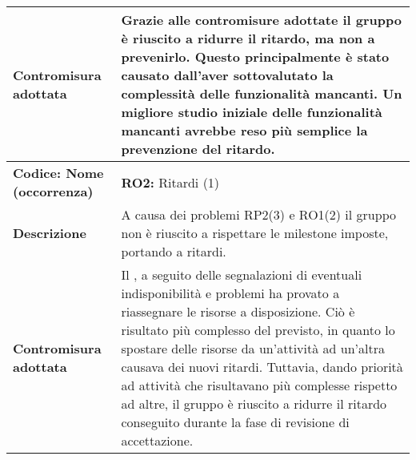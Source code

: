 {\begin{longtable}{C{3.5cm} | C{11cm}}
\textbf{Contromisura adottata} & Grazie alle contromisure adottate il gruppo è riuscito a ridurre il ritardo, ma non a prevenirlo. Questo principalmente è stato causato dall'aver sottovalutato la complessità delle funzionalità mancanti. Un migliore studio iniziale delle funzionalità mancanti avrebbe reso più semplice la prevenzione del ritardo.\\
\hline
\hline
{}\textbf{Codice: Nome (occorrenza)} & \textbf{RO2: }{Ritardi (1)}\\
\textbf{Descrizione} & A causa dei problemi RP2(3) e RO1(2) il gruppo non è riuscito a rispettare le milestone imposte, portando a ritardi.\\
\textbf{Contromisura adottata} & Il \respProg{}, a seguito delle segnalazioni di eventuali indisponibilità e problemi ha provato a riassegnare le risorse a disposizione. Ciò è risultato più complesso del previsto, in quanto lo spostare delle risorse da un'attività ad un'altra causava dei nuovi ritardi. Tuttavia, dando priorità ad attività che risultavano più complesse rispetto ad altre, il gruppo è riuscito a ridurre il ritardo conseguito durante la fase di revisione di accettazione.\\
\hline
\hline
\end{longtable}
}
